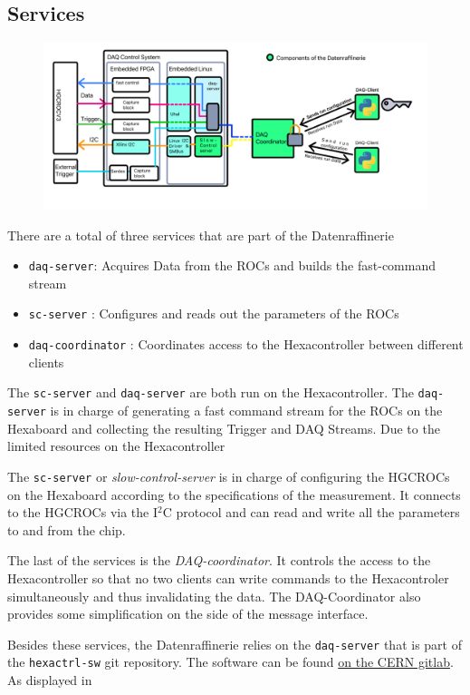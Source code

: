 \documentclass[11pt]{article}
\begin{document}
\subsection{Services}
\begin{figure}
	\includegraphics[width=\textwidth]{datenraffinerie-daq-setup}
	\label{fig:overview}
\end{figure}
There are a total of three services that are part of the Datenraffinerie
\begin{itemize}
	\item \texttt{daq-server}: Acquires Data from the ROCs and builds the fast-command stream
	\item \texttt{sc-server} : Configures and reads out the parameters of the ROCs
	\item \texttt{daq-coordinator} : Coordinates access to the Hexacontroller between different clients
\end{itemize}
The \texttt{sc-server} and \texttt{daq-server} are both run on the Hexacontroller. The \texttt{daq-server} is in charge of generating a fast command stream for the ROCs on the Hexaboard and collecting the resulting Trigger and DAQ Streams. Due to the limited resources on the Hexacontroller 

The \texttt{sc-server} or \emph{slow-control-server} is in charge of configuring the HGCROCs on the Hexaboard according to the specifications of the measurement. It connects to the HGCROCs via the I$^2$C protocol and can read and write all the parameters to and from the chip.

The last of the services is the \emph{DAQ-coordinator}. It controls the access to the Hexacontroller so that no two clients can write commands to the Hexacontroler simultaneously and thus invalidating the data. The DAQ-Coordinator also provides some simplification on the side of the message interface.

Besides these services, the Datenraffinerie relies on the \texttt{daq-server} that is part of the \texttt{hexactrl-sw} git repository. The software can be found \href{https://gitlab.cern.ch/hgcal-daq-sw/hexactrl-sw}{on the CERN gitlab}. As displayed in
\end{document}

